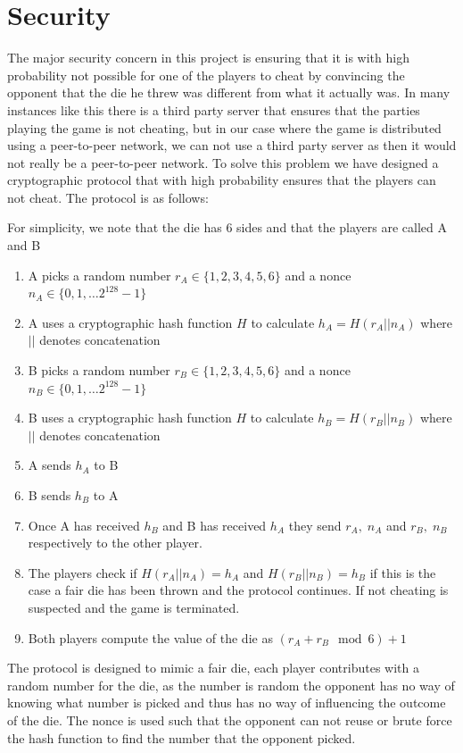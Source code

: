 \documentclass[ twoside,openright,titlepage,numbers=noenddot,headinclude,%
                footinclude=true,cleardoublepage=empty,abstractoff, %
                BCOR=5mm,paper=a4,fontsize=11pt,%
                ngerman,american,%
                ]{scrreprt}
\begin{document}
\section{Security}
\label{sec:security}
The major security concern in this project is ensuring that it is with high probability not possible for one of the players to cheat by convincing the opponent that the die he threw was different from what it actually was. In many instances like this there is a third party server that ensures that the parties playing the game is not cheating, but in our case where the game is distributed using a peer-to-peer network, we can not use a third party server as then it would not really be a peer-to-peer network. To solve this problem we have designed a cryptographic protocol that with high probability ensures that the players can not cheat. The protocol is as follows: 

For simplicity, we note that the die has 6 sides and that the players are called A and B
\begin{enumerate}
  \item A picks a random number $r_A \in \{1,2,3,4,5,6\}$ and a nonce $n_A \in \{0,1,\dots 2^{128}-1\}$
  \item A uses a cryptographic hash function $H$ to calculate $h_A = H(r_A || n_A)$ where $||$ denotes concatenation
  \item B picks a random number $r_B \in \{1,2,3,4,5,6\}$ and a nonce $n_B \in \{0,1,\dots 2^{128}-1\}$
  \item B uses a cryptographic hash function $H$ to calculate $h_B = H(r_B || n_B)$ where $||$ denotes concatenation 
  \item A sends $h_A$ to B
  \item B sends $h_B$ to A
  \item Once A has received $h_B$ and B has received $h_A$ they send $r_A, \; n_A$ and $r_B, \; n_B$ respectively to the other player.
  \item The players check if $H(r_A || n_A) = h_A$ and $H(r_B || n_B) = h_B$ if this is the case a fair die has been thrown and the protocol continues. If not cheating is suspected and the game is terminated.
  \item Both players compute the value of the die as $(r_A + r_B \mod 6) + 1$
\end{enumerate}
The protocol is designed to mimic a fair die, each player contributes with a random number for the die, as the number is random the opponent has no way of knowing what number is picked and thus has no way of influencing the outcome of the die. The nonce is used such that the opponent can not reuse or brute force the hash function to find the number that the opponent picked.
\end{document}
